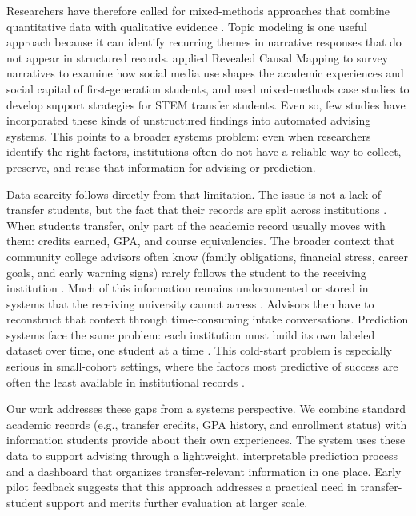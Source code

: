 \documentclass[letterpaper,11pt]{article}
\begin{document}
Researchers have therefore called for mixed-methods approaches that combine quantitative data with qualitative evidence \parencite{nguyen2025school}. Topic modeling is one useful approach because it can identify recurring themes in narrative responses that do not appear in structured records. \textcite{deng2021} applied Revealed Causal Mapping to survey narratives to examine how social media use shapes the academic experiences and social capital of first-generation students, and \textcite{thiry2023} used mixed-methods case studies to develop support strategies for STEM transfer students. Even so, few studies have incorporated these kinds of unstructured findings into automated advising systems. This points to a broader systems problem: even when researchers identify the right factors, institutions often do not have a reliable way to collect, preserve, and reuse that information for advising or prediction.

Data scarcity follows directly from that limitation. The issue is not a lack of transfer students, but the fact that their records are split across institutions \parencite{roksa2008credits}. When students transfer, only part of the academic record usually moves with them: credits earned, GPA, and course equivalencies. The broader context that community college advisors often know (family obligations, financial stress, career goals, and early warning signs) rarely follows the student to the receiving institution \parencite{nguyen2024community}. Much of this information remains undocumented or stored in systems that the receiving university cannot access \parencite{preposttransfer2014}. Advisors then have to reconstruct that context through time-consuming intake conversations. Prediction systems face the same problem: each institution must build its own labeled dataset over time, one student at a time \parencite{coleman2019coldstart}. This cold-start problem is especially serious in small-cohort settings, where the factors most predictive of success are often the least available in institutional records \parencite{coleman2019coldstart}.

Our work addresses these gaps from a systems perspective. We combine standard academic records (e.g., transfer credits, GPA history, and enrollment status) with information students provide about their own experiences. The system uses these data to support advising through a lightweight, interpretable prediction process and a dashboard that organizes transfer-relevant information in one place. Early pilot feedback suggests that this approach addresses a practical need in transfer-student support and merits further evaluation at larger scale.
\end{document}
